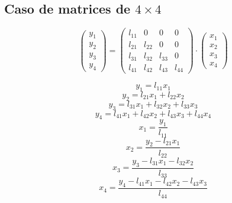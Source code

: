 \documentclass[10pt,a4paper,dvipdfmx]{article}
\begin{document}
\subsection{Caso de matrices de $4\times 4$ }
$$ \left( 
\begin{array}{c}
y_{1} \\
y_{2} \\
y_{3} \\
y_{4} 
 \end{array}
\right)
 = \left( 
\begin{array}{cccc}
l_{{1}{1}} & 0 & 0 & 0 \\
l_{{2}{1}} & l_{{2}{2}} & 0 & 0 \\
l_{{3}{1}} & l_{{3}{2}} & l_{{3}{3}} & 0 \\
l_{{4}{1}} & l_{{4}{2}} & l_{{4}{3}} & l_{{4}{4}} 
 \end{array}
\right)
 \cdot \left( 
\begin{array}{c}
x_{1} \\
x_{2} \\
x_{3} \\
x_{4} 
 \end{array}
\right)
 $$
\begin{multicols}{2}
$$ y_{1} = l_{{1}{1}} x_{1} $$
$$ y_{2} = l_{{2}{1}} x_{1} + l_{{2}{2}} x_{2} $$
$$ y_{3} = l_{{3}{1}} x_{1} + l_{{3}{2}} x_{2} + l_{{3}{3}} x_{3} $$
$$ y_{4} = l_{{4}{1}} x_{1} + l_{{4}{2}} x_{2} + l_{{4}{3}} x_{3} + l_{{4}{4}} x_{4} $$
\vfill\null
\columnbreak
$$ x_{1} = \dfrac{y_{1}}{l_{{1}{1}}} $$
$$ x_{2} = \dfrac{y_{2}- l_{{2}{1}} x_{1}}{l_{{2}{2}}} $$
$$ x_{3} = \dfrac{y_{3}- l_{{3}{1}} x_{1}- l_{{3}{2}} x_{2}}{l_{{3}{3}}} $$
$$ x_{4} = \dfrac{y_{4}- l_{{4}{1}} x_{1}- l_{{4}{2}} x_{2}- l_{{4}{3}} x_{3}}{l_{{4}{4}}} $$
\end{multicols}
\end{document}
